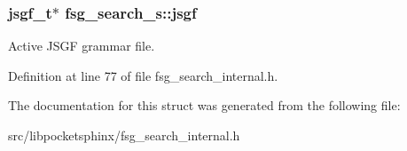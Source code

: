 \subsubsection[{jsgf}]{\setlength{\rightskip}{0pt plus 5cm}jsgf\-\_\-t$\ast$ fsg\-\_\-search\-\_\-s\-::jsgf}\label{structfsg__search__s_a5450c5baac34c706d32f26c1cf373ce3}


Active J\-S\-G\-F grammar file. 



Definition at line 77 of file fsg\-\_\-search\-\_\-internal.\-h.



The documentation for this struct was generated from the following file\-:\begin{DoxyCompactItemize}
\item 
src/libpocketsphinx/fsg\-\_\-search\-\_\-internal.\-h\end{DoxyCompactItemize}
